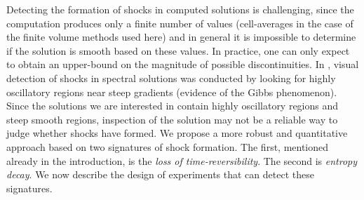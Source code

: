 Detecting the formation of shocks in computed solutions is challenging,
since the computation produces only a finite number of values (cell-averages
in the case of the finite volume methods used here) and in general
it is impossible to determine if the solution is smooth based on these
values.  In practice, one can only expect to obtain an upper-bound on the
magnitude of possible discontinuities.
In \cite{simpson2010}, visual detection of shocks in spectral solutions
was conducted by looking for highly oscillatory regions near steep gradients
(evidence of the Gibbs phenomenon).
Since the solutions we are interested in contain highly oscillatory regions
and steep smooth regions, inspection of the solution may not be a reliable
way to judge whether shocks have formed.  We propose a more robust and
quantitative approach based on two
signatures of shock formation.  The first, mentioned already in the 
introduction, is the {\em loss of time-reversibility}.  The second is 
{\em entropy decay}.  
We now describe the design of experiments that can detect these
signatures.
